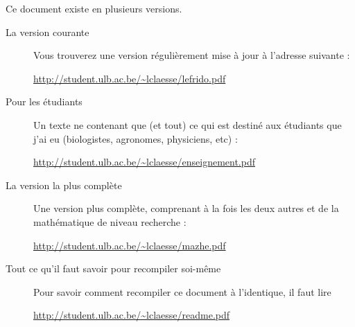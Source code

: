 
\thispagestyle{empty}

Ce document existe en plusieurs versions.
\begin{description}

    \item[La version courante] 

        Vous trouverez une version régulièrement mise à jour à l'adresse suivante :
        \begin{center}
        \url{http://student.ulb.ac.be/~lclaesse/lefrido.pdf}
        \end{center}
        
    \item[Pour les étudiants]

        Un texte ne contenant que (et tout) ce qui est destiné aux étudiants que j'ai eu (biologistes, agronomes, physiciens, etc) :
        \begin{center}
        \url{http://student.ulb.ac.be/~lclaesse/enseignement.pdf}
        \end{center}

    \item[La version la plus complète]

        Une version plus complète, comprenant à la fois les deux autres et de la mathématique de niveau recherche : 
        \begin{center}
        \url{http://student.ulb.ac.be/~lclaesse/mazhe.pdf}
        \end{center}

    \item[Tout ce qu'il faut savoir pour recompiler soi-même]
        Pour savoir comment recompiler ce document à l'identique, il faut lire
        \begin{center}
            \url{http://student.ulb.ac.be/~lclaesse/readme.pdf}
        \end{center}

\end{description}


\vfill

\clearpage
